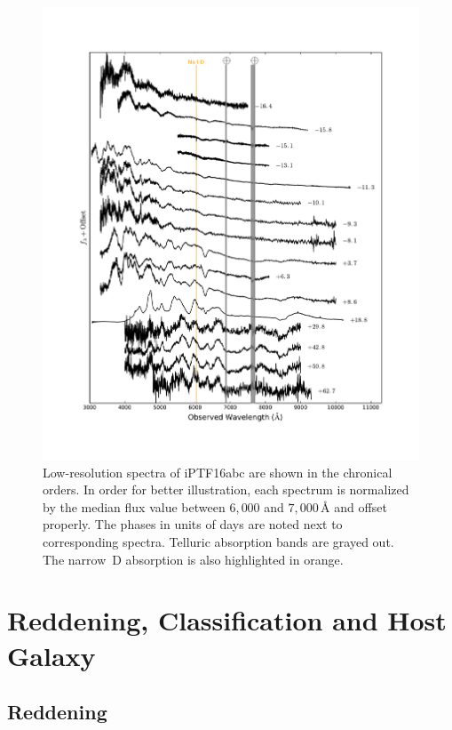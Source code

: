\documentclass[twocolumn]{aastex61}
\begin{document}
\begin{figure}[!htb]
  \centering
  \includegraphics[width=1.0\textwidth]{spectra.pdf}
  \caption{Low-resolution spectra of iPTF16abc are shown in the
    chronical orders. In order for better illustration, each spectrum
    is normalized by the median flux value between $6,000$ and
    $7,000\,\textrm{\AA}$ and offset properly.  The phases in units of
    days are noted next to corresponding spectra. Telluric absorption
    bands are grayed out. The narrow \,D absorption is also
    highlighted in orange.}
  \label{fig:spec_seq}
\end{figure}


\section{Reddening, Classification and Host Galaxy}
\label{sec:usual_staff}

\subsection{Reddening}
\label{sec:reddening}
\end{document}

